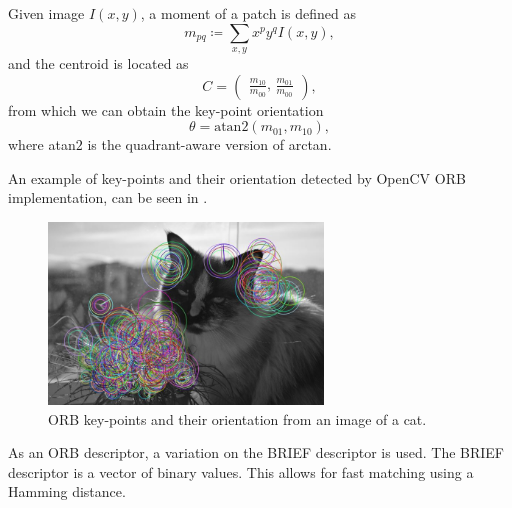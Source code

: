 Given image $I(x,y)$, a moment of a patch is defined as
\begin{equation}
    m_{pq}\coloneqq\sum_{x,y} x^p y^q I(x,y),
\end{equation}
and the centroid is located as
\begin{equation}
    C =
    \begin{pmatrix}
        \frac{m_{10}}{m_{00}} \text{, } \frac{m_{01}}{m_{00}}
    \end{pmatrix},
\end{equation}
from which we can obtain the key-point orientation
\begin{equation}
    \theta = \text{atan}2(m_{01},m_{10}),
\end{equation}
where atan$2$ is the quadrant-aware version of arctan.

An example of key-points and their orientation detected by OpenCV ORB implementation, can be seen in .
\begin{figure}[ht!]
    \centering
    \includegraphics[width=0.65\textwidth]{Figures/orb/orb_example.jpg}
    \caption[ORB key-points and their orientation from an image of a cat]{ORB key-points and their orientation from an image of a cat.}
    \label{fig:orb_example}
\end{figure}

As an ORB descriptor, a variation on the BRIEF descriptor is used. The BRIEF descriptor is a vector of binary values. This allows for fast matching using a Hamming distance.

